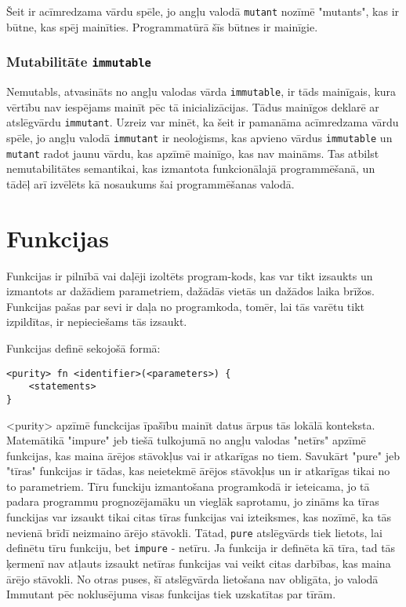 \documentclass[12pt,a4paper]{report}
\begin{document}
Šeit ir acīmredzama vārdu spēle, jo angļu valodā \texttt{mutant} nozīmē "mutants", kas ir būtne, kas spēj mainīties. Programmatūrā šīs būtnes ir mainīgie. 

\subsubsection{Mutabilitāte \texttt{immutable}}

Nemutabls, atvasināts no angļu valodas vārda \texttt{immutable}, ir tāds mainīgais, kura vērtību nav iespējams mainīt pēc tā inicializācijas. Tādus mainīgos deklarē ar atslēgvārdu \texttt{immutant}. Uzreiz var minēt, ka šeit ir pamanāma acīmredzama vārdu spēle, jo angļu valodā \texttt{immutant} ir neoloģisms, kas apvieno vārdus \texttt{immutable} un \texttt{mutant} radot jaunu vārdu, kas apzīmē mainīgo, kas nav maināms. Tas atbilst nemutabilitātes semantikai, kas izmantota funkcionālajā programmēšanā, un tādēļ arī izvēlēts kā nosaukums šai programmēšanas valodā.

\section{Funkcijas}
\label{section:functions}

Funkcijas ir pilnībā vai daļēji izoltēts program-kods, kas var tikt izsaukts un izmantots ar dažādiem parametriem, dažādās vietās un dažādos laika brīžos. Funkcijas pašas par sevi ir daļa no programkoda, tomēr, lai tās varētu tikt izpildītas, ir nepieciešams tās izsaukt. 

Funkcijas definē sekojošā formā:
\begin{verbatim}
<purity> fn <identifier>(<parameters>) {
    <statements>
}
\end{verbatim}

<purity> apzīmē funckcijas īpašību mainīt datus ārpus tās lokālā konteksta. Matemātikā "impure" jeb tiešā tulkojumā no angļu valodas "netīrs" apzīmē funkcijas, kas maina ārējos stāvokļus vai ir atkarīgas no tiem. Savukārt "pure" jeb "tīras" funkcijas ir tādas, kas neietekmē ārējos stāvokļus un ir atkarīgas tikai no to parametriem. Tīru funckiju izmantošana programkodā ir ieteicama, jo tā padara programmu prognozējamāku un vieglāk saprotamu, jo zināms ka tīras funckijas var izsaukt tikai citas tīras funkcijas vai izteiksmes, kas nozīmē, ka tās nevienā brīdī neizmaino ārējo stāvokli. Tātad, \texttt{pure} atslēgvārds tiek lietots, lai definētu tīru funkciju, bet \texttt{impure} - netīru. Ja funkcija ir definēta kā tīra, tad tās ķermenī nav atļauts izsaukt netīras funkcijas vai veikt citas darbības, kas maina ārējo stāvokli. No otras puses, šī atslēgvārda lietošana nav obligāta, jo valodā Immutant pēc noklusējuma visas funkcijas tiek uzskatītas par tīrām.
\end{document}

